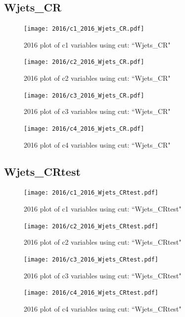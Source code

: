 \documentclass{article}
\begin{document}
      \subsection*{Wjets\_CR}
                        \begin{figure}[H]
                            \centering
                            \caption{2016 plot of c1 variables using cut: ``Wjets\_CR"}
                            \texttt{[image: 2016/c1\_2016\_Wjets\_CR.pdf]}
                        \end{figure}    
                        \begin{figure}[H]
                            \centering
                            \caption{2016 plot of c2 variables using cut: ``Wjets\_CR"}
                            \texttt{[image: 2016/c2\_2016\_Wjets\_CR.pdf]}
                        \end{figure}    
                        \begin{figure}[H]
                            \centering
                            \caption{2016 plot of c3 variables using cut: ``Wjets\_CR"}
                            \texttt{[image: 2016/c3\_2016\_Wjets\_CR.pdf]}
                        \end{figure}    
                        \begin{figure}[H]
                            \centering
                            \caption{2016 plot of c4 variables using cut: ``Wjets\_CR"}
                            \texttt{[image: 2016/c4\_2016\_Wjets\_CR.pdf]}
                        \end{figure}    
      \subsection*{Wjets\_CRtest}
                        \begin{figure}[H]
                            \centering
                            \caption{2016 plot of c1 variables using cut: ``Wjets\_CRtest"}
                            \texttt{[image: 2016/c1\_2016\_Wjets\_CRtest.pdf]}
                        \end{figure}    
                        \begin{figure}[H]
                            \centering
                            \caption{2016 plot of c2 variables using cut: ``Wjets\_CRtest"}
                            \texttt{[image: 2016/c2\_2016\_Wjets\_CRtest.pdf]}
                        \end{figure}    
                        \begin{figure}[H]
                            \centering
                            \caption{2016 plot of c3 variables using cut: ``Wjets\_CRtest"}
                            \texttt{[image: 2016/c3\_2016\_Wjets\_CRtest.pdf]}
                        \end{figure}    
                        \begin{figure}[H]
                            \centering
                            \caption{2016 plot of c4 variables using cut: ``Wjets\_CRtest"}
                            \texttt{[image: 2016/c4\_2016\_Wjets\_CRtest.pdf]}
                        \end{figure}    
\end{document}
